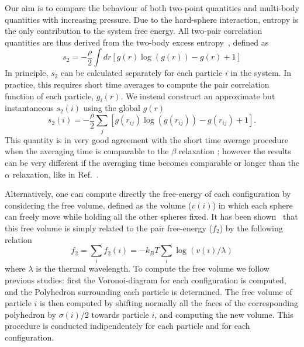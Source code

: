 \documentclass[twocolumn,superscriptaddress]{revtex4-1}
\begin{document}
Our aim is to compare the behaviour of both two-point quantities and multi-body quantities with increasing pressure.
Due to the hard-sphere interaction, entropy is the only contribution to the system free energy.
All two-pair correlation quantities are thus derived from the two-body excess entropy~\cite{Nettleton1958,Mountain1971},
defined as
\begin{equation}
s_2=-\frac{\rho}{2}\int dr\left[g(r)\log(g(r))-g(r)+1\right]
\end{equation}
In principle, $s_2$ can be calculated separately for each particle $i$ in the system. In practice, this requires short time averages to compute the pair correlation function of each particle, $g_i(r)$\cite{tanaka}. We instead construct an approximate but instantaneous $s_2(i)$ using the global $g(r)$
\begin{equation}
s_2(i) = -\frac{\rho}{2}\sum_j \left[g(r_{ij})\log(g(r_{ij}))-g(r_{ij})+1\right].
\end{equation}
This quantity is in very good agreement with the short time average procedure when the averaging time is comparable to the $\beta$ relaxation ; however the results can be very different if the averaging time becomes comparable or longer than the $\alpha$ relaxation, like in Ref.~\cite{tanaka}.

Alternatively, one can compute directly the free-energy of each configuration by
considering the free volume, defined as the volume ($v(i)$) in which each sphere can freely
move while holding all the other spheres fixed. It has been shown~\cite{Aste2004} that this free
volume is simply related to the pair free-energy ($f_2$) by the following relation
\begin{equation}
f_2=\sum_i f_2(i)=-k_BT\sum_i \log(v(i)/\lambda)
\end{equation}
where $\lambda$ is the thermal wavelength. To compute the free volume we follow previous
studies: first the Voronoi-diagram for each configuration is computed, and the Polyhedron
surrounding each particle is determined. The free volume of particle $i$ is then
computed by shifting normally all the faces of the corresponding polyhedron by $\sigma(i)/2$
towards particle $i$, and computing the new volume. This procedure is conducted indipendentely
for each particle and for each configuration.
\end{document}
